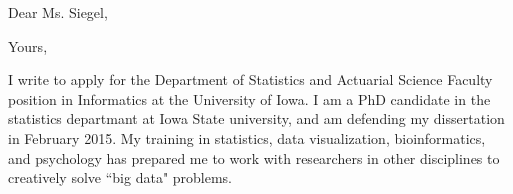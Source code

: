 \documentclass[11pt,letterpaper,sans,unicode]{moderncv}        %
\begin{document}
\date{November 10, 2014}
\opening{Dear Ms. Siegel,}
\closing{Yours,}
\makelettertitle
% 

I write to apply for the Department of Statistics and Actuarial Science Faculty position in Informatics at the University of Iowa. I am a PhD candidate in the statistics departmant at Iowa State university, and am defending my dissertation in February 2015. My training in statistics, data visualization, bioinformatics, and psychology has prepared me to work with researchers in other disciplines to creatively solve ``big data" problems. 



\end{document}
